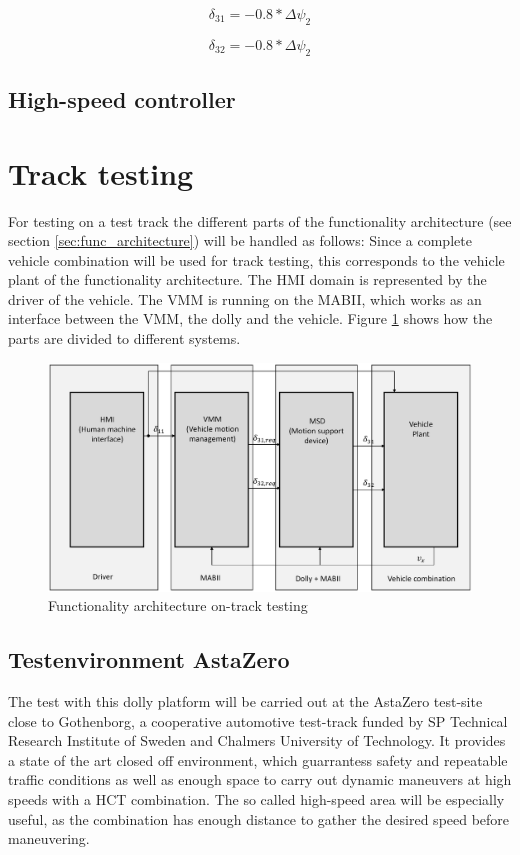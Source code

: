 \documentclass[ExampleMasters.tex]{subfiles}
\begin{document}
\begin{equation}
\delta_{31}=-0.8*\Delta\psi_2
\label{eq:delta31_HIL}
\end{equation}


\begin{equation}
\delta_{32}=-0.8*\Delta\psi_2
\label{eq:delta32_HIL}
\end{equation}


\subsection{High-speed controller}

\section{Track testing}
\label{sec:track-testing}
For testing on a test track the different parts of the  functionality architecture (see section \ref{sec:func_architecture}) will be handled as follows:
Since a complete vehicle combination will be used for track testing, this corresponds to the vehicle plant of the functionality architecture. The \gls{HMI} domain is represented by the driver of the vehicle. The \gls{VMM} is running on the \gls{MABII}, which works as an interface between the \gls{VMM}, the dolly and the vehicle. Figure \ref{fig:funct_architecture_track} shows how the parts are divided to different systems.

\begin{figure}[!htb]
	\centering
	\includegraphics[width=0.5\linewidth]{figures/functionality_architecture_track}
	
	\caption{Functionality architecture on-track testing}
	\label{fig:funct_architecture_track}
\end{figure} 

\subsection{Testenvironment AstaZero}


The test with this dolly platform will be carried out at the AstaZero test-site close to Gothenborg, a cooperative automotive test-track funded by SP Technical Research Institute of Sweden and Chalmers University of Technology. It provides a state of the art closed off environment, which guarrantess safety and repeatable traffic conditions as well as enough space to carry out dynamic maneuvers at high speeds with a \gls{HCT} combination. The so called high-speed area will be especially useful, as the combination has enough distance to gather the desired speed before maneuvering.
\end{document}
